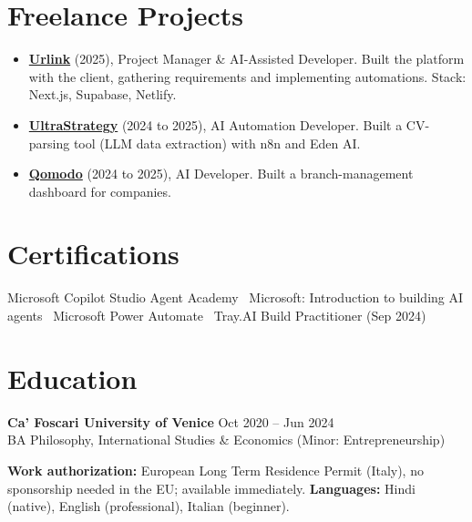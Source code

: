 \documentclass[a4paper,10pt]{article}
\begin{document}
\section{Freelance Projects}
\begin{itemize}
 \item \textbf{\href{https://smarturlink.com/}{Urlink}} (2025), Project Manager \& AI-Assisted Developer. Built the platform with the client, gathering requirements and implementing automations. Stack: Next.js, Supabase, Netlify.
 \item \textbf{\href{https://ultrastrategy.com}{UltraStrategy}} (2024 to 2025), AI Automation Developer. Built a CV-parsing tool (LLM data extraction) with n8n and Eden AI.
 \item \textbf{\href{https://www.qomodo.me/}{Qomodo}} (2024 to 2025), AI Developer. Built a branch-management dashboard for companies.
\end{itemize}

\section{Certifications}
Microsoft Copilot Studio Agent Academy \textbullet\ Microsoft: Introduction to building AI agents \textbullet\ Microsoft Power Automate \textbullet\ Tray.AI Build Practitioner (Sep 2024)

\section{Education}
\textbf{Ca' Foscari University of Venice} \hfill Oct 2020 -- Jun 2024\\
BA Philosophy, International Studies \& Economics (Minor: Entrepreneurship)

\vspace{2pt}
{\small \textbf{Work authorization:} European Long Term Residence Permit (Italy), no sponsorship needed in the EU; available immediately. \quad \textbf{Languages:} Hindi (native), English (professional), Italian (beginner).}
\end{document}
